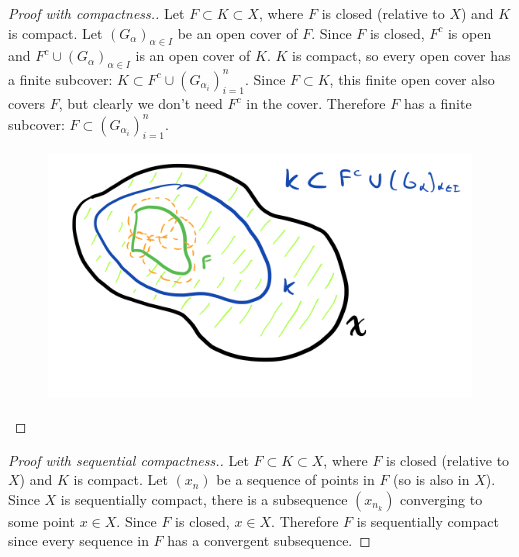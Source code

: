 \documentclass[11pt]{article}
\numberwithin{equation}{section}
\theoremstyle{definition}
\theoremstyle{definition}
\newcommand{\1}{\mathbbm 1}
\begin{document}
\begin{theorem}
\end{theorem}
\begin{proof}[Proof with compactness.]
	Let $F \subset K \subset X$, where $F$ is closed (relative to $X$) and $K$ is compact. Let $(G_\alpha)_{\alpha \in I}$ be an open cover of $F$. Since $F$ is closed, $F^c$ is open and $F^c \cup (G_\alpha)_{\alpha \in I}$ is an open cover of $K$. $K$ is compact, so every open cover has a finite subcover: $K \subset F^c \cup (G_{\alpha_i})_{i=1}^n$. Since $F \subset K$, this finite open cover also covers $F$, but clearly we don't need $F^c$ in the cover. Therefore $F$ has a finite subcover: $F \subset (G_{\alpha_i})_{i=1}^n$.

	\begin{figure}[H]
		\begin{center}
			\includegraphics[scale=.45]{closed_subsets_compact.png}
		\end{center}
	\end{figure}
\end{proof}

\begin{proof}[Proof with sequential compactness.]
	Let $F \subset K \subset X$, where $F$ is closed (relative to $X$) and $K$ is compact. Let $(x_n)$ be a sequence of points in $F$ (so is also in $X$). Since $X$ is sequentially compact, there is a subsequence $(x_{n_k})$ converging to some point $x \in X$. Since $F$ is closed, $x \in X$. Therefore $F$ is sequentially compact since every sequence in $F$ has a convergent subsequence. 
\end{proof}
\end{document}
